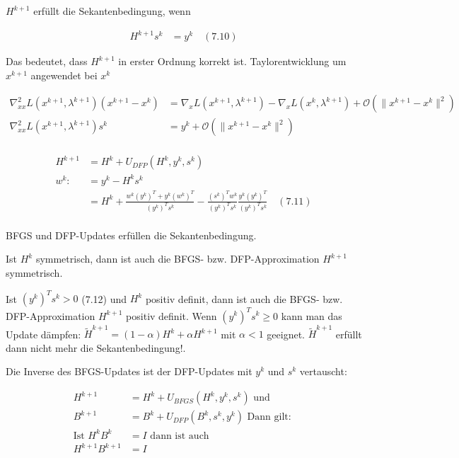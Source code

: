 
$H^{k+1}$ erfüllt die Sekantenbedingung, wenn

\begin{align*}
H^{k+1} s^k &= y^k \quad (7.10)
\end{align*}

Das bedeutet, dass $H^{k+1}$ in erster Ordnung korrekt ist. Taylorentwicklung um $x^{k+1}$ angewendet bei $x^k$

\begin{align*}
\nabla_{xx}^2 L(x^{k+1}, \lambda^{k+1}) (x^{k+1} - x^k) &= \nabla_x L(x^{k+1}, \lambda^{k+1}) - \nabla_x L(x^k, \lambda^{k+1}) + \mathcal O(\|x^{k+1} - x^k\|^2) \\
\nabla_{xx}^2 L(x^{k+1}, \lambda^{k+1}) s^k &= y^k + \mathcal O(\|x^{k+1}-x^k\|^2) \\
\end{align*}



\begin{align*}
H^{k+1} &= H^k + U_{DFP} (H^k, y^k, s^k) \\
w^k :&= y^k - H^k s^k \\
&= H^k + \frac{w^k (y^k)^T + y^k (w^k)^T}{(y^k)^T s^k} - \frac{(s^k)^T w^k}{(y^k)^T s^k} \frac{y^k (y^k)^T}{(y^k)^T s^k} \quad (7.11) \\
\end{align*}


\bitm
\item BFGS und DFP-Updates erfüllen die Sekantenbedingung.
\item Ist $H^k$ symmetrisch, dann ist auch die BFGS- bzw. DFP-Approximation $H^{k+1}$ symmetrisch.
\item Ist $(y^k)^T s^k > 0$ (7.12) und $H^k$ positiv definit, dann ist auch die BFGS- bzw. DFP-Approximation $H^{k+1}$ positiv definit. Wenn $(y^k)^T s^k \geq 0$ kann man das Update dämpfen: $\tilde H^{k+1} = (1-\alpha) H^k + \alpha H^{k+1}$ mit $\alpha < 1$ geeignet. $\tilde H^{k+1}$ erfüllt dann nicht mehr die Sekantenbedingung!.
\eitm


Die Inverse des BFGS-Updates ist der DFP-Updates mit $y^k$ und $s^k$ vertauscht:

\begin{align*}
H^{k+1} &= H^k + U_{BFGS} (H^k, y^k, s^k) \text{ und } \\
B^{k+1} &= B^k + U_{DFP}  (B^k, s^k, y^k) \text{ Dann gilt: } \\
\text{Ist } H^k B^k &= I \text{ dann ist auch } \\
H^{k+1} B^{k+1} &= I \\
\end{align*}

